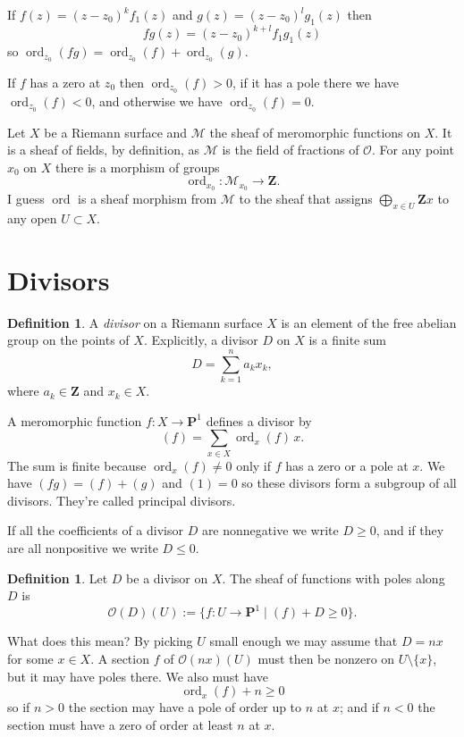 \documentclass[11pt]{article}
\theoremstyle{definition}
\newtheorem{defi}[theo]{Definition}
\newcommand{\cc}[1]{\mathcal{#1}}
\def\ZZ{\mathbf{Z}}
\def\PP{\mathbf{P}}
\DeclareMathOperator{\ord}{ord}
\begin{document}
If $f(z) = (z - z_0)^k f_1(z)$ and $g(z) = (z - z_0)^l g_1(z)$ then
$$
fg(z) = (z - z_0)^{k + l} f_1g_1(z)
$$
so $\ord_{z_0}(fg) = \ord_{z_0}(f) + \ord_{z_0}(g)$.

If $f$ has a zero at $z_0$ then $\ord_{z_0}(f) > 0$,
if it has a pole there we have $\ord_{z_0}(f) < 0$, and otherwise we have
$\ord_{z_0}(f) = 0$.


Let $X$ be a Riemann surface and $\cc M$ the sheaf of meromorphic functions on $X$.
It is a sheaf of fields, by definition, as $\cc M$ is the field of fractions of
$\cc O$. For any point $x_0$ on $X$ there is a morphism of groups
$$
\ord_{x_0} : \cc M_{x_0} \to \ZZ.
$$
I guess $\ord$ is a sheaf morphism from $\cc M$ to the sheaf that assigns
$\bigoplus_{x \in U} \ZZ x$ to any open $U \subset X$.



\section{Divisors}


\begin{defi}
A \emph{divisor} on a Riemann surface $X$ is an element of the free abelian group
on the points of $X$.
Explicitly, a divisor $D$ on $X$ is a finite sum
$$
D = \sum_{k=1}^n a_k x_k,
$$
where $a_k \in \ZZ$ and $x_k \in X$.
\end{defi}


A meromorphic function $f : X \to \PP^1$ defines a divisor by
$$
(f) = \sum_{x \in X} \ord_x(f) \, x.
$$
The sum is finite because $\ord_x(f) \not= 0$ only if $f$ has a zero or a pole
at $x$.
We have $(fg) = (f) + (g)$ and $(1) = 0$ so these divisors form a subgroup of
all divisors. They're called principal divisors.

If all the coefficients of a divisor $D$ are nonnegative we write $D \geq 0$,
and if they are all nonpositive we write $D \leq 0$.


\begin{defi}
Let $D$ be a divisor on $X$.
The sheaf of functions with poles along $D$ is
$$
\cc O(D)(U)
:= \{ f : U \to \PP^1 \mid (f) + D \geq 0 \}.
$$
\end{defi}


What does this mean?
By picking $U$ small enough we may assume that $D = n x$ for some $x \in X$.
A section $f$ of $\cc O(nx)(U)$ must then be nonzero on $U \setminus \{x\}$,
but it may have poles there.
We also must have
$$
\ord_x(f) + n \geq 0
$$
so if $n > 0$ the section may have a pole of order up to $n$ at $x$;
and if $n < 0$ the section must have a zero of order at least $n$ at $x$. 
\end{document}
